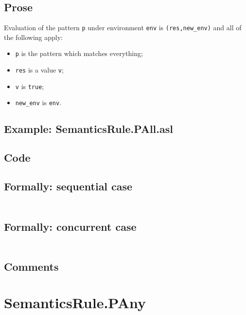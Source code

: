 \documentclass{book}
\begin{document}
  \subsection{Prose}
  Evaluation of the pattern \texttt{p} under environment \texttt{env} is
  \texttt{(res,new\_env)} and all of the following apply:
  \begin{itemize}  
  \item \texttt{p} is the pattern which matches everything;
  \item \texttt{res} is a value \texttt{v};
  \item \texttt{v} is \texttt{true};
  \item \texttt{new\_env} is \texttt{env}.
  \end{itemize}

  \subsection{Example: SemanticsRule.PAll.asl}

  \subsection{Code}

  \subsection{Formally: sequential case}
  \begin{align}
  \end{align} 

  \subsection{Formally: concurrent case}
  \begin{align}
  \end{align} 

  \subsection{Comments}

\section{SemanticsRule.PAny \label{sec:SemanticsRule.PAny}}
\end{document}
